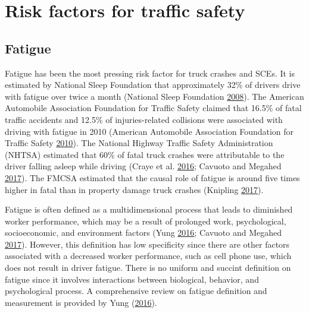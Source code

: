 \documentclass[12pt]{book}
\numberwithin{equation}{chapter}
\begin{document}
\hypertarget{risk-factors-for-traffic-safety}{%
\section{Risk factors for traffic safety}\label{risk-factors-for-traffic-safety}}

\hypertarget{fatigue}{%
\subsection{Fatigue}\label{fatigue}}

Fatigue has been the most pressing risk factor for truck crashes and SCEs. It is estimated by National Sleep Foundation that approximately 32\% of drivers drive with fatigue over twice a month (National Sleep Foundation \protect\hyperlink{ref-nsleepf}{2008}). The American Automobile Association Foundation for Traffic Safety claimed that 16.5\% of fatal traffic accidents and 12.5\% of injuries-related collisions were associated with driving with fatigue in 2010 (American Automobile Association Foundation for Traffic Safety \protect\hyperlink{ref-aaafoundation}{2010}). The National Highway Traffic Safety Administration (NHTSA) estimated that 60\% of fatal truck crashes were attributable to the driver falling asleep while driving (Craye et al. \protect\hyperlink{ref-craye2016multi}{2016}; Cavuoto and Megahed \protect\hyperlink{ref-cavuoto2017understanding}{2017}). The FMCSA estimated that the causal role of fatigue is around five times higher in fatal than in property damage truck crashes (Knipling \protect\hyperlink{ref-knipling2017threats}{2017}).

Fatigue is often defined as a multidimensional process that leads to diminished worker performance, which may be a result of prolonged work, psychological, socioeconomic, and environment factors (Yung \protect\hyperlink{ref-yung2016fatigue}{2016}; Cavuoto and Megahed \protect\hyperlink{ref-cavuoto2017understanding}{2017}). However, this definition has low specificity since there are other factors associated with a decreased worker performance, such as cell phone use, which does not result in driver fatigue. There is no uniform and succint definition on fatigue since it involves interactions between biological, behavior, and psychological process. A comprehensive review on fatigue definition and measurement is provided by Yung (\protect\hyperlink{ref-yung2016fatigue}{2016}).
\end{document}
